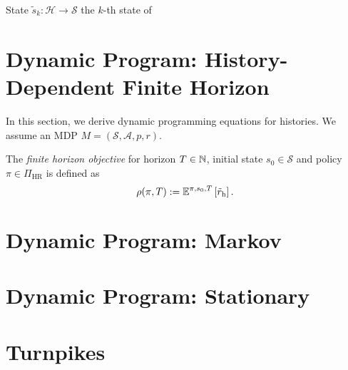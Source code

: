 \begin{definition}
State $\tilde{s}_k \colon \mathcal{H} \to \mathcal{S}$ the $k$-th state of 
\end{definition}

\section{Dynamic Program: History-Dependent Finite Horizon}

In this section, we derive dynamic programming equations for histories. We assume an MDP $M = (\mathcal{S}, \mathcal{A}, p, r)$.

\begin{definition}
  The \emph{finite horizon objective} for horizon $T\in \mathbb{N}$, initial state $s_0\in \mathcal{S} $ and policy $\pi\in \Pi_{\mathrm{HR}}$ is defined as
  \[
    \rho(\pi, T) :=
    \mathbb{E}^{\pi, s_0, T} \left[\tilde{r}_{\mathrm{h}} \right].
  \]
\end{definition}


\section{Dynamic Program: Markov}

\section{Dynamic Program: Stationary}

\section{Turnpikes}

